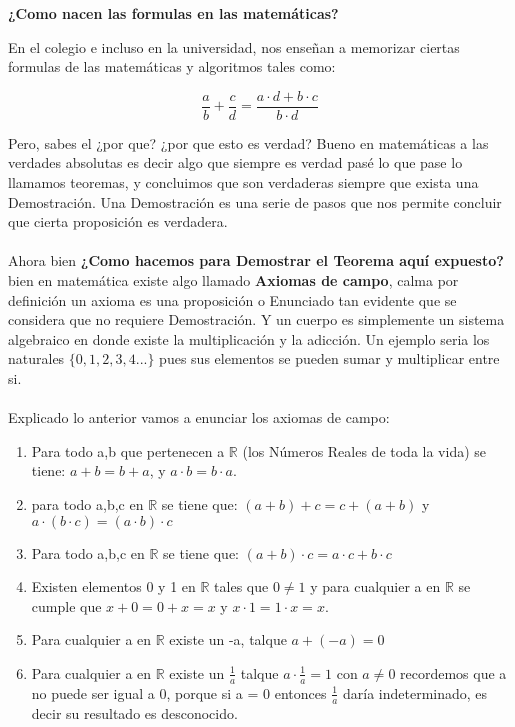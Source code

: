 \documentclass{article}
\begin{document}
\begin{center}
    \textbf{¿Como nacen las formulas en las matemáticas?}
\end{center}
    En el colegio e incluso en la universidad, nos enseñan a memorizar ciertas formulas de las matemáticas
    y algoritmos tales como:

    \begin{equation*}
        \frac{a}{b}+\frac{c}{d}=\frac{a \cdot d + b \cdot c}{b \cdot d}
    \end{equation*}

    Pero, sabes el ¿por que? ¿por que esto es verdad? Bueno en matemáticas a las verdades
    absolutas es decir algo que siempre es verdad pasé lo que pase lo llamamos teoremas, y concluimos
    que son verdaderas siempre que exista una Demostración. Una Demostración es una serie de pasos
    que nos permite concluir que cierta proposición es verdadera.
\\
\\ 
Ahora bien \textbf{¿Como hacemos para Demostrar el Teorema aquí expuesto?} bien en matemática
existe algo llamado \textbf{Axiomas de campo}, calma por definición un axioma es una proposición o
Enunciado tan evidente que se considera que no requiere Demostración. Y un cuerpo es simplemente
un sistema algebraico en donde existe la multiplicación y la adicción. Un ejemplo seria los naturales
 $\{0,1,2,3,4...\}$ pues sus elementos se pueden sumar y multiplicar entre si.
\\
\\ 
Explicado lo anterior vamos a enunciar los axiomas de campo:
\begin{enumerate}
    \item Para todo a,b que pertenecen a $\mathbb R$ (los Números Reales de toda la vida) se tiene: 
    $a + b = b + a$, y $a \cdot b = b \cdot a$.
    \item para todo a,b,c en $\mathbb R$ se tiene que:  $(a+b)+c = c+(a+b)$ y $a \cdot (b \cdot c)= (a \cdot b) \cdot c$
    \item Para todo a,b,c en  $\mathbb R$ se tiene que: $(a + b) \cdot c = a \cdot c + b \cdot c $
    \item Existen elementos 0 y 1 en $\mathbb{R}$ tales que $0 \not = 1$ y para cualquier a en $\mathbb R$ se cumple que 
    $x + 0 = 0 + x = x$ y $x \cdot 1 = 1 \cdot x = x.$
    \item Para cualquier a en $\mathbb R$ existe un -a, talque $a+(-a)=0$
    \item Para cualquier a en $\mathbb R$ existe un $\frac{1}{a}$ talque $a \cdot \frac{1}{a} = 1$ con $ a \not = 0$ 
     recordemos que a no puede ser igual a 0, porque si a = 0 entonces $\frac{1}{a}$ daría indeterminado, es decir su resultado es desconocido.
\end{enumerate}
\end{document}

